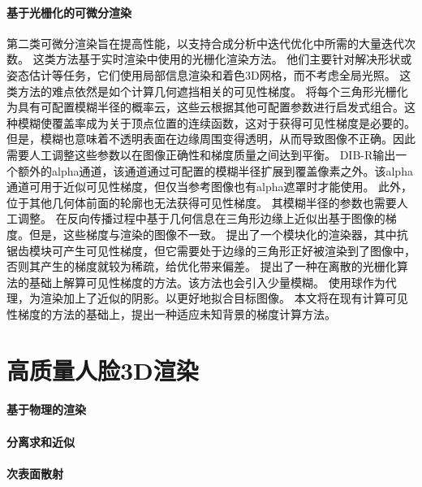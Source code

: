 \paragraph{基于光栅化的可微分渲染}
第二类可微分渲染旨在提高性能，以支持合成分析中迭代优化中所需的大量迭代次数。
这类方法基于实时渲染中使用的光栅化渲染方法。
他们主要针对解决形状或姿态估计等任务，它们使用局部信息渲染和着色3D网格，而不考虑全局光照。
这类方法的难点依然是如个计算几何遮挡相关的可见性梯度。
\citet{softras}将每个三角形光栅化为具有可配置模糊半径的概率云，这些云根据其他可配置参数进行启发式组合。这种模糊使覆盖率成为关于顶点位置的连续函数，这对于获得可见性梯度是必要的。
但是，模糊也意味着不透明表面在边缘周围变得透明，从而导致图像不正确。因此需要人工调整这些参数以在图像正确性和梯度质量之间达到平衡。
DIB-R\citep{ChenLGSLJF19}输出一个额外的alpha通道，该通道通过可配置的模糊半径扩展到覆盖像素之外。该alpha通道可用于近似可见性梯度，但仅当参考图像也有alpha遮罩时才能使用。
此外，位于其他几何体前面的轮廓也无法获得可见性梯度。
其模糊半径的参数也需要人工调整。
\citet{KatoUH18}在反向传播过程中基于几何信息在三角形边缘上近似出基于图像的梯度。但是，这些梯度与渲染的图像不一致。
\citet{nvdiffrast}提出了一个模块化的渲染器，其中抗锯齿模块可产生可见性梯度，但它需要处于边缘的三角形正好被渲染到了图像中，否则其产生的梯度就较为稀疏，给优化带来偏差。
\citet{ColeGSVZ21}提出了一种在离散的光栅化算法的基础上解算可见性梯度的方法。该方法也会引入少量模糊。
\citet{LyuHL0TT21}使用球作为代理，为渲染加上了近似的阴影。以更好地拟合目标图像。
本文将在现有计算可见性梯度的方法的基础上，提出一种适应未知背景的梯度计算方法。

\section{高质量人脸3D渲染}

\paragraph{基于物理的渲染}

\paragraph{分离求和近似}

\paragraph{次表面散射}
